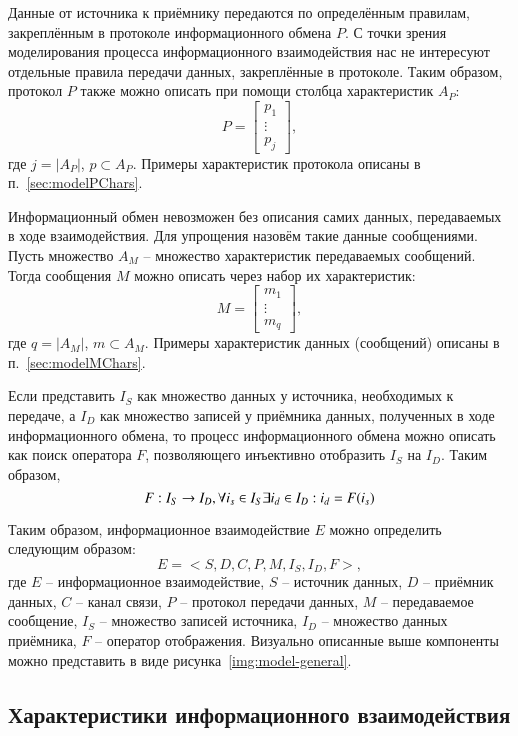 Данные от источника к приёмнику передаются по определённым правилам, закреплённым в протоколе информационного обмена $P$.
С точки зрения моделирования процесса информационного взаимодействия нас не интересуют отдельные правила передачи данных, закреплённые в протоколе.
Таким образом, протокол $P$ также можно описать при помощи столбца характеристик $A_P$:
$$
P = \begin{bmatrix}
p_{1} \\
\vdots \\
p_{j}
\end{bmatrix},
$$
где $j = |A_P|$, $p \subset A_P$.
Примеры характеристик протокола описаны в п.~\ref{sec:modelPChars}.

Информационный обмен невозможен без описания самих данных, передаваемых в ходе взаимодействия.
Для упрощения назовём такие данные сообщениями.
Пусть множество $A_M$ -- множество характеристик передаваемых сообщений.
Тогда сообщения $M$ можно описать через набор их характеристик:
$$
M = \begin{bmatrix}
m_{1} \\
\vdots \\
m_{q}
\end{bmatrix},
$$
где $q = |A_M|$, $m \subset A_M$.
Примеры характеристик данных (сообщений) описаны в п.~\ref{sec:modelMChars}.

Если представить $I_S$ как множество данных у источника, необходимых к передаче, а $I_D$ как множество записей у приёмника данных, полученных в ходе информационного обмена, то процесс информационного обмена можно описать как поиск оператора $F$, позволяющего инъективно отобразить $I_S$ на $I_D$.
Таким образом,
$$
F: I_S \to I_D, \newline
\forall i_s \in I_S \exists i_d \in I_D : i_d = F(i_s)
$$

Таким образом, информационное взаимодействие $E$ можно определить следующим образом:
$$
E = <S,D,C,P,M,I_S,I_D,F>,
$$
где $E$ -- информационное взаимодействие, $S$ -- источник данных, $D$ -- приёмник данных, $C$ -- канал связи, $P$ -- протокол передачи данных, $M$ -- передаваемое сообщение, $I_S$ -- множество записей источника, $I_D$ -- множество данных приёмника, $F$ -- оператор отображения.
Визуально описанные выше компоненты можно представить в виде рисунка~\ref{img:model-general}.


\subsection{Характеристики информационного взаимодействия}

